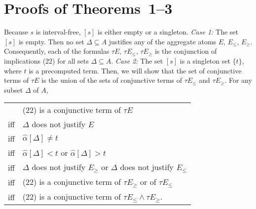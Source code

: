 \documentclass{tlp_mod}
\begin{document}
\section*{Proofs of Theorems~1--3}
\label{app:proofs}

\begin{proof*}[Proof of Theorem~1]
Because $s$ is interval-free, 
$[s]$ is either empty or a singleton. {\it Case 1:} The set $[s]$ is 
empty. Then no set $\Delta \subseteq A$ justifies any of the aggregate atoms
$E$, $E_{\leq}$, $E_{\geq}$. Consequently, each of the formulas
$\tau E$, $\tau E_{\leq}$, $\tau E_{\geq}$ is the conjunction of implications
(22) for all sets $\Delta \subseteq A$. 
{\it Case 2:} The set $[s]$ is a singleton set $\{t\}$, where $t$ is a precomputed term. 
Then, we will show that the set of conjunctive terms of $\tau E$ is the union
of the sets of conjunctive terms of $\tau E_{\leq}$ and $\tau E_{\geq}$. 
For any subset $\Delta$ of $A$,
\begin{center}
\begin{tabular}{l  l}
    & (22) is a conjunctive term of $\tau E$ \\
iff & $\Delta$ does not justify $E$ \\
iff & $\widehat{\alpha}[\Delta] \not = t$ \\
iff & $\widehat{\alpha}[\Delta] < t$ or $\widehat{\alpha}[\Delta] > t$ \\
iff & $\Delta$ does not justify $E_{\ge}$ or $\Delta$ does not justify
$E_{\le}$\\
iff & (22) is a conjunctive term of $\tau E_{\ge}$ or of
$\tau E_{\le}$\\
iff & (22) is a conjunctive term of $\tau E_{\le} \land \tau E_{\ge}.$ 
\end{tabular}
\end{center}
\end{proof*}
\end{document}
